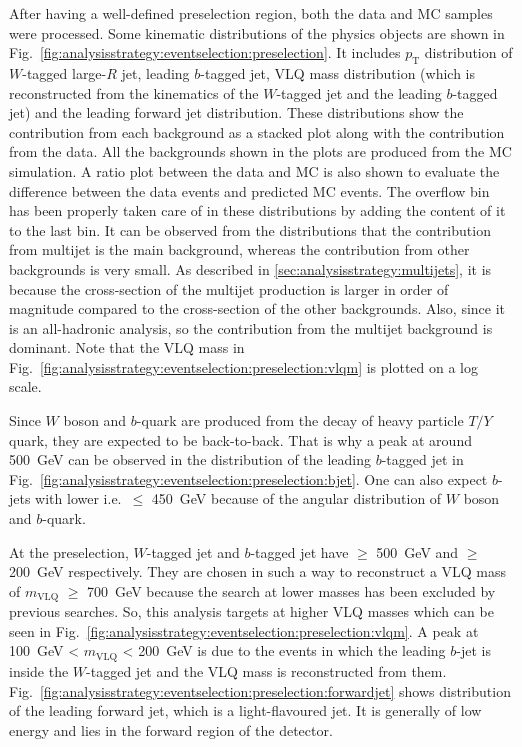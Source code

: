 After having a well-defined preselection region, both the data and MC samples were processed. Some kinematic distributions of the physics objects are shown in Fig.\ \ref{fig:analysisstrategy:eventselection:preselection}. It includes $p_{\text{T}}$ distribution of $W$-tagged large-$R$ jet, leading $b$-tagged jet, VLQ mass distribution (which is reconstructed from the kinematics of the $W$-tagged jet and the leading $b$-tagged jet) and the leading forward jet distribution. These distributions show the contribution from each background as a stacked plot along with the contribution from the data. All the backgrounds shown in the plots are produced from the MC simulation. A ratio plot between the data and MC is also shown to evaluate the difference between the data events and predicted MC events. The overflow bin has been properly taken care of in these distributions by adding the content of it to the last bin. It can be observed from the distributions that the contribution from multijet is the main background, whereas the contribution from other backgrounds is very small. As described in \ref{sec:analysisstrategy:multijets}, it is because the cross-section of the multijet production is larger in order of magnitude compared to the cross-section of the other backgrounds. Also, since it is an all-hadronic analysis, so the contribution from the multijet background is dominant. Note that the VLQ mass in Fig.\ \ref{fig:analysisstrategy:eventselection:preselection:vlqm} is plotted on a log scale.

Since $W$ boson and $b$-quark are produced from the decay of heavy particle $T/Y$ quark, they are expected to be back-to-back. That is why a peak at around \SI{500}{\giga\electronvolt} can be observed in the \pt distribution of the leading $b$-tagged jet in Fig.\ \ref{fig:analysisstrategy:eventselection:preselection:bjet}. One can also expect $b$-jets with lower \pt i.e.\ \pt $\leq$ \SI{450}{\giga\electronvolt} because of the angular distribution of $W$ boson and $b$-quark. 

At the preselection, $W$-tagged jet and $b$-tagged jet have \pt $\geq$ \SI{500}{\giga\electronvolt} and \pt $\geq$ \SI{200}{\giga\electronvolt} respectively. They are chosen in such a way to reconstruct a VLQ mass of $m_{\text{VLQ}}$ $\geq$ \SI{700}{\giga\electronvolt} because the search at lower masses has been excluded by previous searches. So, this analysis targets at higher VLQ masses which can be seen in Fig.\ \ref{fig:analysisstrategy:eventselection:preselection:vlqm}. A peak at \SI{100}{\giga\electronvolt} < $m_{\text{VLQ}}$ < \SI{200}{\giga\electronvolt} is due to the events in which the leading $b$-jet is inside the $W$-tagged jet and the VLQ mass is reconstructed from them. Fig.\ \ref{fig:analysisstrategy:eventselection:preselection:forwardjet} shows \pt distribution of the leading forward jet, which is a light-flavoured jet. It is generally of low energy and lies in the forward region of the detector.

